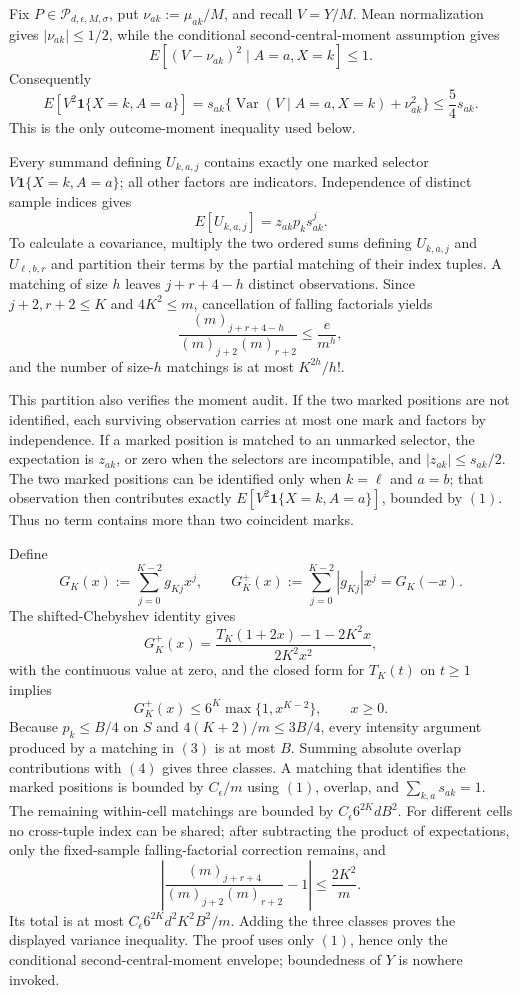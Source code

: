 Fix \(P\in\mathcal P_{d,\epsilon,M,\sigma}\), put \(\nu_{ak}:=\mu_{ak}/M\), and recall \(V=Y/M\).  Mean normalization gives \(|\nu_{ak}|\le1/2\), while the conditional second-central-moment assumption gives
\[
 E[(V-\nu_{ak})^2\mid A=a,X=k]\le1.
\]
Consequently
\[
 E[V^2\mathbf 1\{X=k,A=a\}]
 =s_{ak}\{\operatorname{Var}(V\mid A=a,X=k)+\nu_{ak}^2\}
 \le\frac54s_{ak}.
\tag{1}
\]
This is the only outcome-moment inequality used below.

Every summand defining \(U_{k,a,j}\) contains exactly one marked selector \(V\mathbf 1\{X=k,A=a\}\); all other factors are indicators.  Independence of distinct sample indices gives
\[
 E[U_{k,a,j}]=z_{ak}p_ks_{ak}^{j}.
\tag{2}
\]
To calculate a covariance, multiply the two ordered sums defining \(U_{k,a,j}\) and \(U_{\ell,b,r}\) and partition their terms by the partial matching of their index tuples.  A matching of size \(h\) leaves \(j+r+4-h\) distinct observations.  Since \(j+2,r+2\le K\) and \(4K^2\le m\), cancellation of falling factorials yields
\[
 \frac{(m)_{j+r+4-h}}{(m)_{j+2}(m)_{r+2}}
 \le\frac e{m^h},
\tag{3}
\]
and the number of size-\(h\) matchings is at most \(K^{2h}/h!\).

This partition also verifies the moment audit.  If the two marked positions are not identified, each surviving observation carries at most one mark and factors by independence.  If a marked position is matched to an unmarked selector, the expectation is \(z_{ak}\), or zero when the selectors are incompatible, and \(|z_{ak}|\le s_{ak}/2\).  The two marked positions can be identified only when \(k=\ell\) and \(a=b\); that observation then contributes exactly \(E[V^2\mathbf 1\{X=k,A=a\}]\), bounded by \((1)\).  Thus no term contains more than two coincident marks.

Define
\[
 G_K(x):=\sum_{j=0}^{K-2}g_{Kj}x^j,
 \qquad G_K^+(x):=\sum_{j=0}^{K-2}|g_{Kj}|x^j=G_K(-x).
\]
The shifted-Chebyshev identity gives
\[
 G_K^+(x)=\frac{T_K(1+2x)-1-2K^2x}{2K^2x^2},
\]
with the continuous value at zero, and the closed form for \(T_K(t)\) on \(t\ge1\) implies
\[
 G_K^+(x)\le6^K\max\{1,x^{K-2}\},\qquad x\ge0.
\tag{4}
\]
Because \(p_k\le B/4\) on \(S\) and \(4(K+2)/m\le3B/4\), every intensity argument produced by a matching in \((3)\) is at most \(B\).  Summing absolute overlap contributions with \((4)\) gives three classes.  A matching that identifies the marked positions is bounded by \(C_{\epsilon}/m\) using \((1)\), overlap, and \(\sum_{k,a}s_{ak}=1\).  The remaining within-cell matchings are bounded by \(C_{\epsilon}6^{2K}dB^2\).  For different cells no cross-tuple index can be shared; after subtracting the product of expectations, only the fixed-sample falling-factorial correction remains, and
\[
 \left|\frac{(m)_{j+r+4}}{(m)_{j+2}(m)_{r+2}}-1\right|
 \le\frac{2K^2}{m}.
\tag{5}
\]
Its total is at most \(C_{\epsilon}6^{2K}d^2K^2B^2/m\).  Adding the three classes proves the displayed variance inequality.  The proof uses only \((1)\), hence only the conditional second-central-moment envelope; boundedness of \(Y\) is nowhere invoked.